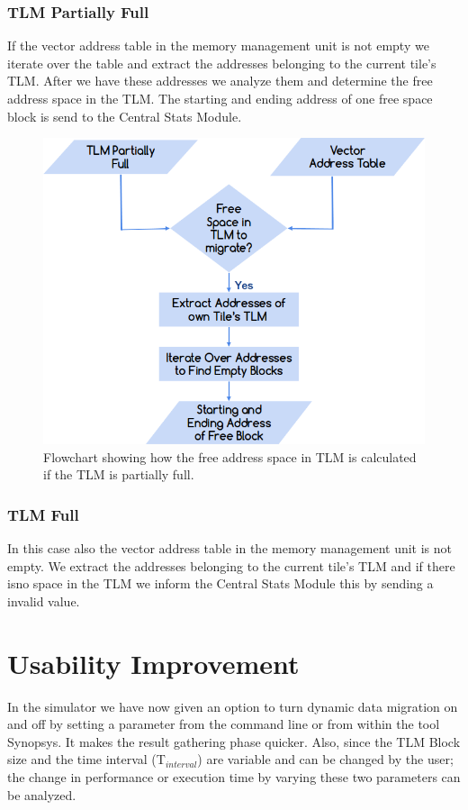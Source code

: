 \documentclass{listhesis}
\begin{document}
\subsubsection{TLM Partially Full}
If the vector address table in the memory management unit is not empty we iterate over the table and extract the addresses belonging to the current tile's TLM. After we have these addresses we analyze them and determine the free address space in the TLM. The starting and ending address of one free space block is send to the Central Stats Module.\\
\begin{figure}
  \includegraphics[width=0.7\linewidth]{tlmpartiallyempty.png}
  \centering
  \caption{Flowchart showing how the free address space in TLM is calculated if the TLM is partially full.}
  \label{fig:freeSpaceTLM}
\end{figure}
\subsubsection{TLM Full}
In this case also the vector address table in the memory management unit is not empty. We extract the addresses belonging to the current tile's TLM and if there isno space in the TLM we inform the Central Stats Module this by sending a invalid value.\\
\section{Usability Improvement}
In the simulator we have now given an option to turn dynamic data migration on and off by setting a parameter from the command line or from within the tool Synopsys. It makes the result gathering phase quicker. Also, since the TLM Block size and the time interval (T$_{interval}$) are variable and can be changed by the user; the change in performance or execution time by varying these two parameters can be analyzed.
\end{document}

